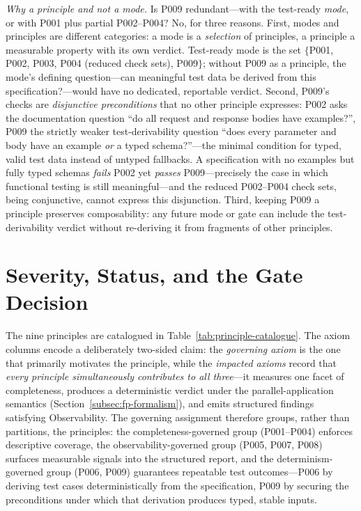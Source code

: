 \textit{Why a principle and not a mode.} Is P009 redundant---with the test-ready \emph{mode}, or with P001 plus partial P002--P004? No, for three reasons. First, modes and principles are different categories: a mode is a \emph{selection} of principles, a principle a measurable property with its own verdict. Test-ready mode is the set $\{$P001, P002, P003, P004 (reduced check sets), P009$\}$; without P009 as a principle, the mode's defining question---can meaningful test data be derived from this specification?---would have no dedicated, reportable verdict. Second, P009's checks are \emph{disjunctive preconditions} that no other principle expresses: P002 asks the documentation question ``do all request and response bodies have examples?'', P009 the strictly weaker test-derivability question ``does every parameter and body have an example \emph{or} a typed schema?''---the minimal condition for typed, valid test data instead of untyped fallbacks. A specification with no examples but fully typed schemas \emph{fails} P002 yet \emph{passes} P009---precisely the case in which functional testing is still meaningful---and the reduced P002--P004 check sets, being conjunctive, cannot express this disjunction. Third, keeping P009 a principle preserves composability: any future mode or gate can include the test-derivability verdict without re-deriving it from fragments of other principles.

\section{Severity, Status, and the Gate Decision}
\label{sec:severity-and-gate}

The nine principles are catalogued in Table~\ref{tab:principle-catalogue}. The axiom columns encode a deliberately two-sided claim: the \textit{governing axiom} is the one that primarily motivates the principle, while the \textit{impacted axioms} record that \emph{every principle simultaneously contributes to all three}---it measures one facet of completeness, produces a deterministic verdict under the parallel-application semantics (Section~\ref{subsec:fp-formalism}), and emits structured findings satisfying Observability. The governing assignment therefore groups, rather than partitions, the principles: the completeness-governed group (P001--P004) enforces descriptive coverage, the observability-governed group (P005, P007, P008) surfaces measurable signals into the structured report, and the determinism-governed group (P006, P009) guarantees repeatable test outcomes---P006 by deriving test cases deterministically from the specification, P009 by securing the preconditions under which that derivation produces typed, stable inputs.

